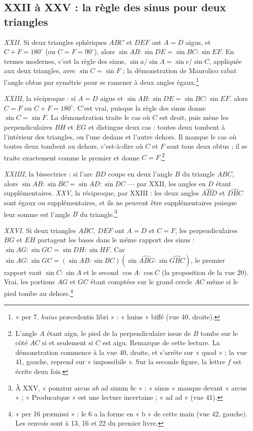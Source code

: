 \documentclass[11pt,a4paper]{article}
\begin{document}
\subsection*{XXII à XXV : la règle des sinus pour deux triangles}

\emph{XXII.} Si deux triangles sphériques $ABC$ et $DEF$ ont $A = D$ aigus, et
$C + F = 180^\circ$ (ou $C = F = 90^\circ$), alors
$\sin AB : \sin DE = \sin BC : \sin EF$. En termes modernes, c'est la règle des
sinus, $\sin a/\sin A = \sin c/\sin C$, appliquée aux deux triangles, avec
$\sin C = \sin F$ ; la démonstration de Maurolico rabat l'angle obtus par
symétrie pour se ramener à deux angles égaux.\footnote{« per 7. \emph{huius}
præcedentis libri » : « huius » biffé (vue 40, droite).}

\emph{XXIII}, la réciproque : si $A = D$ aigus et $\sin AB : \sin DE = \sin BC :
\sin EF$, alors $C = F$ ou $C + F = 180^\circ$. C'est vrai, puisque la règle des
sinus donne $\sin C = \sin F$. La démonstration traite le cas où $C$ est droit,
puis mène les perpendiculaires $BH$ et $EG$ et distingue deux cas : toutes deux
tombent à l'intérieur des triangles, ou l'une dedans et l'autre dehors. Il manque
le cas où toutes deux tombent au dehors, c'est-à-dire où $C$ et $F$ sont tous deux
obtus ; il se traite exactement comme le premier et donne $C = F$.\footnote{L'angle
$A$ étant aigu, le pied de la perpendiculaire issue de $B$ tombe sur le côté $AC$
si et seulement si $C$ est aigu. Remarque de cette lecture. La démonstration
commence à la vue 40, droite, et s'arrête sur « quod » ; la vue 41, gauche,
reprend sur « impossibile ». Sur la seconde figure, la lettre $f$ est écrite
deux fois.}

\emph{XXIIII}, la bissectrice : si l'arc $BD$ coupe en deux l'angle $B$ du
triangle $ABC$, alors $\sin AB : \sin BC = \sin AD : \sin DC$ — par XXII, les
angles en $D$ étant supplémentaires. \emph{XXV}, la réciproque, par XXIII : les
deux angles $\widehat{ABD}$ et $\widehat{DBC}$ sont égaux ou supplémentaires, et
ils ne peuvent être supplémentaires puisque leur somme est l'angle $B$ du
triangle.\footnote{À XXV, « ponatur arcus $ab$ ad sinum $bc$ » : « sinus »
manque devant « arcus » ; « Producatque » est une lecture incertaine ; « ad ad »
(vue 41).}

\emph{XXVI.} Si deux triangles $ABC$, $DEF$ ont $A = D$ et $C = F$, les
perpendiculaires $BG$ et $EH$ partagent les bases dans le même rapport des sinus :
$\sin AG : \sin GC = \sin DH : \sin HF$. Car
$\sin AG : \sin GC = (\sin AB : \sin BC)(\sin\widehat{ABG} : \sin\widehat{GBC})$,
le premier rapport vaut $\sin C : \sin A$ et le second $\cos A : \cos C$ (la
proposition de la vue 20). Vrai, les portions $AG$ et $GC$ étant comptées sur le
grand cercle $AC$ même si le pied tombe au dehors.\footnote{« per 16 præmissi » :
le 6 a la forme en « b » de cette main (vue 42, gauche). Les renvois sont à 13,
16 et 22 du premier livre.}
\end{document}
